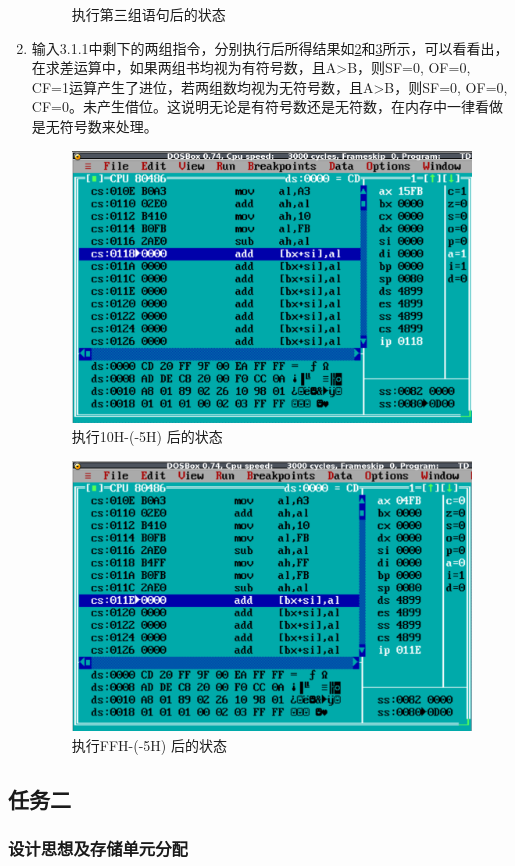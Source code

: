 \documentclass{article}
\begin{document}
\begin{enumerate}
\begin{figure}[H]
				\caption{执行第三组语句后的状态}
				\label{fig:stat3}
			\end{figure}
		\item 输入3.1.1中剩下的两组指令，分别执行后所得结果如\ref{fig:stat4}和\ref{fig:stat5}所示，可以看看出，在求差运算中，如果两组书均视为有符号数，且A>B，则SF=0, OF=0, CF=1运算产生了进位，若两组数均视为无符号数，且A>B，则SF=0, OF=0, CF=0。未产生借位。这说明无论是有符号数还是无符数，在内存中一律看做是无符号数来处理。
			\begin{figure}[H]
				\centering
				\includegraphics[width=0.7\linewidth]{res/homework_1/fig4.png}
				\caption{执行10H-(-5H) 后的状态}
				\label{fig:stat4}
			\end{figure}
			\begin{figure}[H]
				\centering
				\includegraphics[width=0.7\linewidth]{res/homework_1/fig5.png}
				\caption{执行FFH-(-5H) 后的状态}
				\label{fig:stat5}
			\end{figure}
	\end{enumerate}

	\subsection{任务二}
	\subsubsection{设计思想及存储单元分配}
\end{document}
